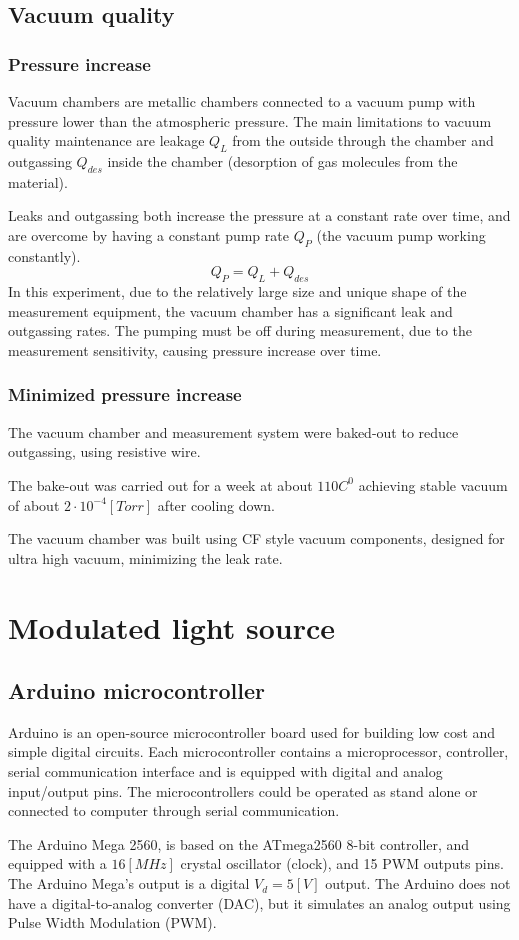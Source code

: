 \documentclass[\main/master.tex]{subfiles}
\begin{document}
\subsection{Vacuum quality}
\subsubsection{Pressure increase}
\par\noindent
Vacuum chambers are metallic chambers connected to a vacuum pump with pressure lower than the atmospheric pressure. The main limitations to vacuum quality maintenance are leakage $Q_L$ from the outside through the chamber and outgassing $Q_{des}$ inside the chamber (desorption of gas molecules from the material).
\par\noindent
Leaks and outgassing both increase the pressure at a constant rate over time, and are overcome by having a constant pump rate $Q_P$ (the vacuum pump working constantly).   
\begin{equation}
Q_P = Q_L + Q_{des}  \label{eqn:vacuum_equilibrium}
\end{equation}
In this experiment, due to the relatively large size and unique shape of the measurement equipment, the vacuum chamber has a significant leak and outgassing rates. The pumping must be off during measurement, due to the measurement sensitivity, causing pressure increase over time.
\subsubsection{Minimized pressure increase}
\par\noindent
The vacuum chamber and measurement system were baked-out to reduce outgassing, using resistive wire. 
\par\noindent
The bake-out was carried out for a week at about $110 C^0$ achieving stable vacuum of about $2\cdot 10^{−4} [Torr]$ after cooling down.
\par\noindent
The vacuum chamber was built using CF style vacuum components, designed for ultra high vacuum, minimizing the leak rate.
\section{Modulated light source}

\subsection{Arduino microcontroller}
Arduino is an open-source microcontroller board used for building low cost and simple digital circuits. Each microcontroller contains a microprocessor, controller, serial communication interface and is equipped with digital and analog input/output pins. The microcontrollers could be operated as stand alone or connected to computer through serial communication. 
\par\noindent
The Arduino Mega 2560, is based on the ATmega2560 8-bit controller, and equipped with a $16 [MHz]$ crystal oscillator (clock), and 15 PWM outputs pins. The Arduino Mega's output is a digital $V_d = 5[V]$ output. The Arduino does not have a digital-to-analog converter (DAC), but it simulates an analog output using Pulse Width Modulation (PWM). 
\end{document}
